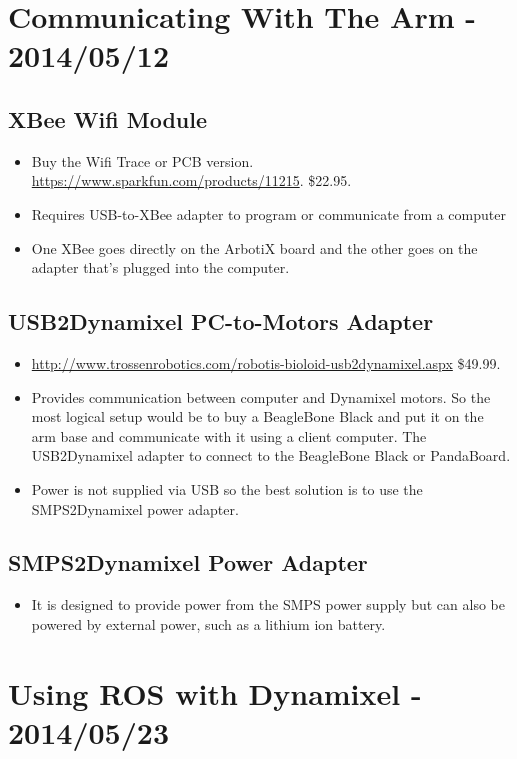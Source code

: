 \documentclass[letterpaper, 10 pt]{article}
\begin{document}

\section{Communicating With The Arm - 2014/05/12}
  \subsection{XBee Wifi Module}
    \begin{itemize}
      \item Buy the Wifi Trace or PCB version. \url{https://www.sparkfun.com/products/11215}. \$22.95.
      \item Requires USB-to-XBee adapter to program or communicate from a computer
      \item One XBee goes directly on the ArbotiX board and the other goes on the adapter that's plugged into the computer.
    \end{itemize}
  \subsection{USB2Dynamixel PC-to-Motors Adapter}
    \begin{itemize}
      \item \url{http://www.trossenrobotics.com/robotis-bioloid-usb2dynamixel.aspx} \$49.99.
      \item Provides communication between computer and Dynamixel motors. So the most logical setup would be to buy a BeagleBone Black and put it on the arm base and communicate with it using a client computer. The USB2Dynamixel adapter to connect to the BeagleBone Black or PandaBoard.
      \item Power is not supplied via USB so the best solution is to use the SMPS2Dynamixel power adapter.
    \end{itemize}
  \subsection{SMPS2Dynamixel Power Adapter}
    \begin{itemize}
      \item It is designed to provide power from the SMPS power supply but can also be powered by external power, such as a lithium ion battery.
    \end{itemize}
    

\section{Using ROS with Dynamixel - 2014/05/23}
\end{document}
